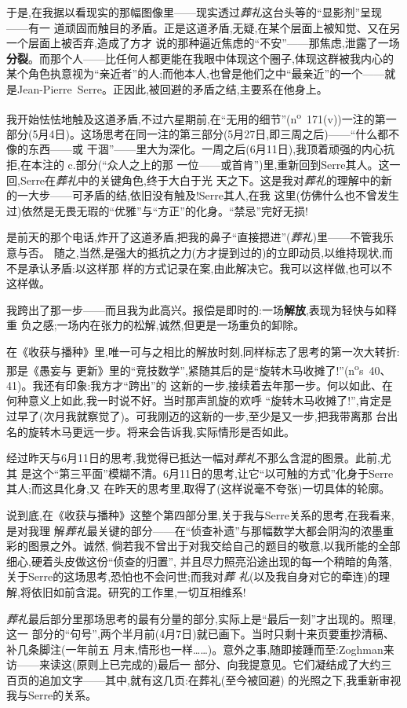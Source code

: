 于是,在我据以看现实的那幅图像里——现实透过\emph{葬礼}这台头等的“显影剂”呈现——有一
道顽固而触目的矛盾。正是这道矛盾,无疑,\dmark{}在某个层面上被知觉、又在另一个层面上被否弃,造成了方才
说的那种逼近焦虑的“不安”——那焦虑,泄露了一场\textbf{分裂}。而那个人——比任何人都更能在我眼中体现这个圈子,体现这群被我内心的某个角色执意视为“亲近者”的人;而他本人,也曾是他们之中“最亲近”的一个——就是Jean-Pierre~Serre。正因此,被回避的矛盾之结,主要系在他身上。

\pmark 我开始怯怯地触及这道矛盾,不过六星期前,在“无用的细节”(n\textsuperscript{o}~171(v))一注的第一
部分(5月4日)。这场思考在同一注的第三部分(5月27日,即三周之后)——“什么都不像的东西——或
干涸”——里大为深化。一周之后(6月11日),我顶着顽强的内心抗拒,在本注的 c.部分(“众人之上的那
一位——或首肯”)里,重新回到Serre其人。这一回,Serre在\emph{葬礼}中的关键角色,终于大白于光
天之下。这是我对\emph{葬礼}的理解中的新的一大步——可矛盾的结,依旧没有触及!Serre其人,在我
这里(仿佛什么也不曾发生过)依然是无畏无瑕的“优雅”与“方正”的化身。“禁忌”完好无损!

是前天的那个电话,炸开了这道矛盾,把我的鼻子“直接摁进”(\emph{葬礼})里——不管我乐意与否。
随之,当然,是强大的抵抗之力(方才提到过的)的立即动员,以维持现状,而不是承认矛盾:以这样那
样的方式记录在案,由此解决它。我可以这样做,也可以不这样做。

\pmark 我跨出了那一步——而且我为此高兴。报偿是即时的:一场\textbf{解放},表现为轻快与如释重
负之感;一场内在张力的松解,诚然,但更是一场重负的卸除。

在《收获与播种》里,唯一可与之相比的解放时刻,同样标志了思考的第一次大转折:那是《愚妄与
更新》里的“竞技数学”,紧随其后的是“旋转木马收摊了!”(n\textsuperscript{o}s~40、41)。我还有印象:我方才“跨出”的
这新的一步,接续着去年那一步。何以如此\dmark{}、在何种意义上如此,我一时说不好。当时那声凯旋的欢呼
“旋转木马收摊了!”,肯定是过早了(次月我就察觉了)。可我刚迈的这新的一步,至少是又一步,把我带离那
台出名的旋转木马更远一步。将来会告诉我,实际情形是否如此。

经过昨天与6月11日的思考,我觉得已抵达一幅对\emph{葬礼}不那么含混的图景。此前,尤其
是这个“第三平面”模糊不清。6月11日的思考,让它“以可触的方式”化身于Serre其人;而这具化身,又
在昨天的思考里,取得了(这样说毫不夸张)一切具体的轮廓。

\pmark 说到底,在《收获与播种》这整个第四部分里,关于我与Serre关系的思考,在我看来,是对我理
解\emph{葬礼}最关键的部分——在“侦查补遗”与那幅数学大都会阴沟的浓墨重彩的图景之外。诚然,
倘若我不曾出于对我交给自己的题目的敬意,以我所能的全部细心,硬着头皮做这份“侦查的归置”,
并且尽力照亮沿途出现的每一个稍暗的角落,关于Serre的这场思考,恐怕也不会问世;而我对\emph{葬
礼}(以及我自身对它的牵连)的理解,将依旧如前含混。研究的工作里,一切互相维系!

\pmark \emph{葬礼}最后部分里那场思考的最有分量的部分,实际上是“最后一刻”才出现的。照理,这一
部分的“句号”,两个半月前(4月7日)就已画下。当时只剩十来页要重抄清稿、补几条脚注(一年前五
月末,情形也一样……)。意外之事,随即接踵而至:Zoghman来访——来读这(原则上已完成的)最后一
部分、向我提意见。它们凝结成了大约三百页的追加文字——其中,就有这几页:在葬礼(至今被回避)
的光照之下,我重新审视我与Serre的关系。

